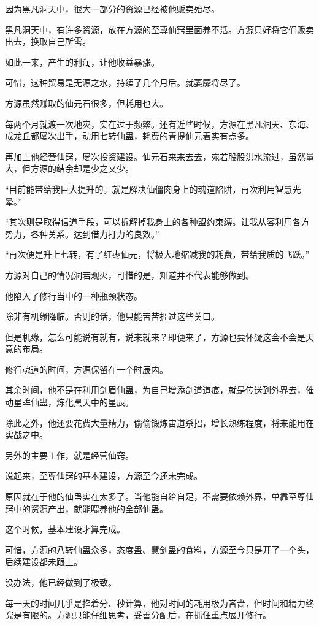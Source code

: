 \begin{this_body}
因为黑凡洞天中，很大一部分的资源已经被他贩卖殆尽。

黑凡洞天中，有许多资源，放在方源的至尊仙窍里面养不活。方源只好将它们贩卖出去，换取自己所需。

如此一来，产生的利润，让他收益暴涨。

可惜，这种贸易是无源之水，持续了几个月后。就萎靡将尽了。

方源虽然赚取的仙元石很多，但耗用也大。

每两个月就渡一次地灾，实在过于频繁。还有近些时候，方源在黑凡洞天、东海、成龙丘都屡次出手，动用七转仙蛊，耗费的青提仙元着实有点多。

再加上他经营仙窍，屡次投资建设。仙元石来来去去，宛若股股洪水流过，虽然量大，但方源的结余却是少之又少。

“目前能带给我巨大提升的。就是解决仙僵肉身上的魂道陷阱，再次利用智慧光晕。”

“其次则是取得信道手段，可以拆解掉我身上的各种盟约束缚。让我从容利用各方势力，各种关系。达到借力打力的良效。”

“再次便是升上七转，有了红枣仙元，将极大地缩减我的耗费，带给我质的飞跃。”

方源对自己的情况洞若观火，可惜的是，知道并不代表能够做到。

他陷入了修行当中的一种瓶颈状态。

除非有机缘降临。否则的话，他只能苦苦捱过这些关口。

但是机缘，怎么可能说有就有，说来就来？即便来了，方源也要怀疑这会不会是天意的布局。

修行魂道的时间，方源保留在一个时辰内。

其余时间，他不是在利用剑眉仙蛊，为自己增添剑道道痕，就是传送到外界去，催动星眸仙蛊，炼化黑天中的星辰。

除此之外，他还要花费大量精力，偷偷锻炼宙道杀招，增长熟练程度，将来能用在实战之中。

另外的主要工作，就是经营仙窍。

说起来，至尊仙窍的基本建设，方源至今还未完成。

原因就在于他的仙蛊实在太多了。当他能自给自足，不需要依赖外界，单靠至尊仙窍中的资源产出，就能喂养他的全部仙蛊。

这个时候，基本建设才算完成。

可惜，方源的八转仙蛊众多，态度蛊、慧剑蛊的食料，方源至今只是开了一个头，后续建设都未跟上。

没办法，他已经做到了极致。

每一天的时间几乎是掐着分、秒计算，他对时间的耗用极为吝啬，但时间和精力终究是有限的。方源只能仔细思考，妥善分配后，在抓住重点展开修行。


\end{this_body}
